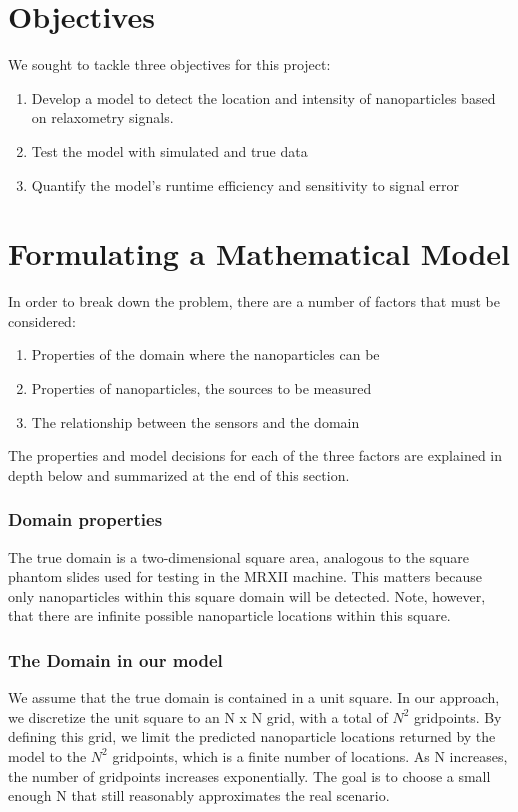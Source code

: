 \documentclass[a4paper]{article}
\begin{document}
\section{Objectives}
We sought to tackle three objectives for this project:

\begin{enumerate}
\item Develop a model to detect the location and intensity of nanoparticles based on relaxometry signals. 
\item Test the model with simulated and true data
\item Quantify the model’s runtime efficiency and sensitivity to signal error
\end{enumerate}

\section{Formulating a Mathematical Model}

In order to break down the problem, there are a number of factors that must be considered:

\begin{enumerate}
\item Properties of the domain where the nanoparticles can be
\item Properties of nanoparticles, the sources to be measured
\item The relationship between the sensors and the domain
\end{enumerate}

The properties and model decisions for each of the three factors are explained in depth below and summarized at the end of this section.

\subsubsection*{Domain properties}
The true domain is a two-dimensional square area, analogous to the square phantom slides used for testing in the MRXII machine. This matters because only nanoparticles within this square domain will be detected. Note, however, that there are infinite possible nanoparticle locations within this square.

\subsubsection*{The Domain in our model}
We assume that the true domain is contained in a unit square. In our approach, we discretize the unit square to an N x N grid, with a total of $N^2$ gridpoints. By defining this grid, we limit the predicted nanoparticle locations returned by the model to the $N^2$ gridpoints, which is a finite number of locations. As N increases, the number of gridpoints increases exponentially. The goal is to choose a small enough N that still reasonably approximates the real scenario.
\end{document}

